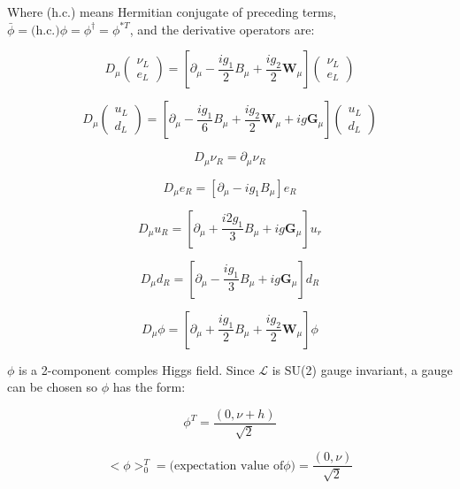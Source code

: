 \documentclass[12pt,a4paper,pagesize=pdftex]{scrartcl}
\newcommand{\icol}[1]{%
  \left(\begin{smallmatrix}#1\end{smallmatrix}\right)%
}
\begin{document}
Where (h.c.) means Hermitian conjugate of preceding terms, $\bar{\phi}=\text{(h.c.)}\phi=\phi^\dagger=\phi^{*T}$, and the derivative operators are:

\begin{equation*}
	D_\mu\icol{\nu_L\\e_L}=\left[\partial_\mu-\frac{ig_1}{2}B_\mu+\frac{ig_2}{2}\mathbf{W}_\mu\right]\icol{\nu_L\\e_L}
\end{equation*}

\begin{equation*}
	D_\mu\icol{u_L\\d_L}=\left[\partial_\mu-\frac{ig_1}{6}B_\mu+\frac{ig_2}{2}\mathbf{W}_\mu+ig\mathbf{G}_\mu\right]\icol{u_L\\d_L}
\end{equation*}

\begin{equation*}
	D_\mu\nu_R=\partial_\mu\nu_R
\end{equation*}

\begin{equation*}
	D_\mu e_R=\left[\partial_\mu-ig_1B_\mu\right]e_R
\end{equation*}

\begin{equation*}
	D_\mu u_R=\left[\partial_\mu+\frac{i2g_1}{3}B_\mu+ig\mathbf{G}_\mu\right]u_r
\end{equation*}

\begin{equation*}
	D_\mu d_R=\left[\partial_\mu - \frac{ig_1}{3}B_\mu+ig\mathbf{G}_\mu\right]d_R
\end{equation*}

\begin{equation*}
	D_\mu\phi=\left[\partial_\mu+\frac{ig_1}{2}B_\mu+\frac{ig_2}{2}\mathbf{W}_\mu\right]\phi
\end{equation*}

$\phi$ is a 2-component comples Higgs field. Since $\mathcal{L}$ is SU(2) gauge invariant, a gauge can be chosen so $\phi$ has the form:

\begin{equation*}
	\phi^T=\frac{\left(0,\nu+h\right)}{\sqrt{2}}
\end{equation*}

\begin{equation*}
	<\phi>_0^T=\text{(expectation value of}\phi)=\frac{\left(0,\nu\right)}{\sqrt{2}}
\end{equation*}
\end{document}
